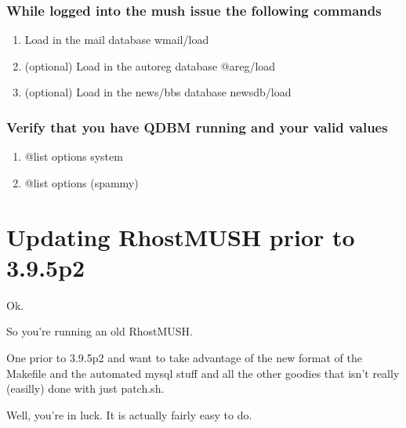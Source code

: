\documentclass[letterpaper,10pt,english]{sphinxmanual}
\begin{document}
\subsection{While logged into the mush issue the following commands}
\label{\detokenize{33-qdbm:while-logged-into-the-mush-issue-the-following-commands}}\begin{enumerate}
%
\item {} 
\sphinxAtStartPar
Load in the mail database
wmail/load

\item {} 
\sphinxAtStartPar
(optional) Load in the autoreg database
@areg/load

\item {} 
\sphinxAtStartPar
(optional) Load in the news/bbs database
newsdb/load

\end{enumerate}


\subsection{Verify that you have QDBM running and your valid values}
\label{\detokenize{33-qdbm:verify-that-you-have-qdbm-running-and-your-valid-values}}\begin{enumerate}
%
\item {} 
\sphinxAtStartPar
@list options system

\item {} 
\sphinxAtStartPar
@list options (spammy)

\end{enumerate}


\chapter{Updating RhostMUSH prior to 3.9.5p2}
\label{\detokenize{34-upgrade:updating-rhostmush-prior-to-3-9-5p2}}\label{\detokenize{34-upgrade::doc}}
\sphinxAtStartPar
Ok.

\sphinxAtStartPar
So you’re running an old RhostMUSH.

\sphinxAtStartPar
One prior to 3.9.5p2 and want to take advantage of the new
format of the Makefile and the automated mysql stuff and
all the other goodies that isn’t really (easilly) done
with just patch.sh.

\sphinxAtStartPar
Well, you’re in luck.  It is actually fairly easy to do.
\end{document}
